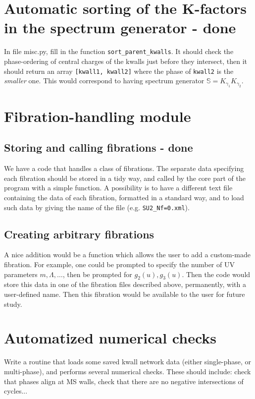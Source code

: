 \documentclass[11pt]{report}
\begin{document}
\section{Automatic sorting of the K-factors in the spectrum generator   - {\color{red} \bf done}}
In file misc.py, fill in the function {\tt sort\_{parent\_{kwalls}}}. It should check the phase-ordering of central charges of the kwalls just before they intersect, then it should return an array {\tt [kwall1, kwall2]} where the phase of {\tt kwall2} is the \emph{smaller} one. This would correspond to having spectrum generator $\mathbb{S} = K_{\gamma_{1}}K_{\gamma_{2}}$.


\section{Fibration-handling module}
\subsection{Storing and calling fibrations - {\color{red} \bf done}}
We have a code that handles a class of fibrations. The separate data specifying each fibration should be stored in a tidy way, and called by the core part of the program with a simple function.
A possibility is to have a different text file containing the data of each fibration, formatted in a standard way, and to load such data by giving the name of the file (e.g. {\tt SU2\_Nf=0.xml}).

\subsection{Creating arbitrary fibrations}
A nice addition would be a function which allows the user to add a custom-made fibration. For example, one could be prompted to specify the number of UV parameters $m,\Lambda,\dots$, then be prompted for $g_{2}(u), g_{3}(u)$. Then the code would store this data in one of the fibration files described above, permanently, with a user-defined name. Then this fibration would be available to the user for future study.




\section{Automatized numerical checks}
Write a routine that loads some saved kwall network data (either single-phase, or multi-phase), and performs several numerical checks. These should include: check that phases align at MS walls, check that there are no negative intersections of cycles...
\end{document}

